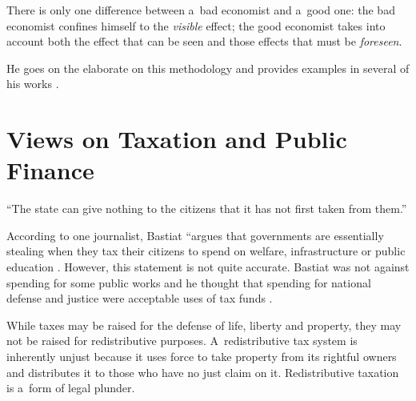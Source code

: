 There is only one difference between a~bad economist and a~good one: the bad economist confines himself to the \textit{visible} effect; the good economist takes into account both the effect that can be seen and those effects that must be \textit{foreseen}. 
\parencite[][p.1]{bastiat_selected_1964}%




He goes on the elaborate on this methodology and provides examples in several of his works 
\parencites[][]{bastiat_ce_1850}[][]{bastiat_harmonies_1870}[][]{bastiat_ce_1873}[][]{bastiat_sophismes_1873}[][]{bastiat_economic_1964}[][]{bastiat_economic_1964-1}[][]{bastiat_selected_1964}[][]{bastiat_bastiat_2007}.%




\section{Views on Taxation and Public Finance}

``The state can give nothing to the citizens that it has not first taken from them.'' 
\parencite[][p.183]{bastiat_selected_1964}%




According to one journalist, Bastiat ``argues that governments are essentially stealing when they tax their citizens to spend on welfare, infrastructure or public education 
\parencite[][]{zernike_shaping_2010}. %
 However, this statement is not quite accurate. Bastiat was not against spending for some public works 
\parencite[][p.46]{bastiat_economic_1964} %
 and he thought that spending for national defense and justice were acceptable uses of tax funds 
\parencite[][p.184]{bastiat_selected_1964}.%




While taxes may be raised for the defense of life, liberty and property, they may not be raised for redistributive purposes. A~redistributive tax system is inherently unjust because it uses force to take property from its rightful owners and distributes it to those who have no just claim on it. Redistributive taxation is a~form of legal plunder.



